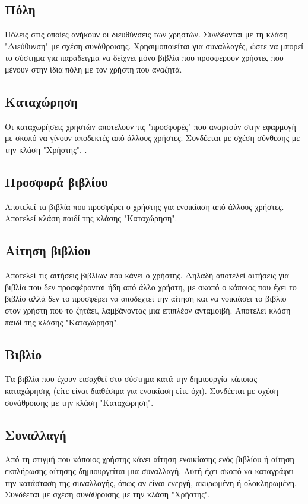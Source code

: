 \documentclass[12pt,a4paper]{article}
\begin{document}
\subsection{Πόλη}
Πόλεις στις οποίες ανήκουν οι διευθύνσεις των χρηστών. Συνδέονται με τη κλάση "Διεύθυνση" με σχέση συνάθροισης. Χρησιμοποιείται για συναλλαγές, ώστε να μπορεί το σύστημα για παράδειγμα να δείχνει μόνο βιβλία που προσφέρουν χρήστες που μένουν στην ίδια πόλη με τον χρήστη που αναζητά.

\subsection{Καταχώρηση}
Οι καταχωρήσεις χρηστών αποτελούν τις "προσφορές" που αναρτούν στην εφαρμογή με σκοπό να γίνουν αποδεκτές από άλλους χρήστες. Συνδέεται με σχέση σύνθεσης με την κλάση "Χρήστης".
.
\subsection{Προσφορά βιβλίου}
Αποτελεί τα βιβλία που προσφέρει ο χρήστης για ενοικίαση από άλλους χρήστες. Αποτελεί κλάση παιδί της κλάσης "Καταχώρηση".

\subsection{Αίτηση βιβλίου}
Αποτελεί τις αιτήσεις βιβλίων που κάνει ο χρήστης. Δηλαδή αποτελεί αιτήσεις για βιβλία που δεν προσφέρονται ήδη από άλλο χρήστη, με σκοπό ο κάποιος που έχει το βιβλίο αλλά δεν το προσφέρει να αποδεχτεί την αίτηση και να νοικιάσει το βιβλίο στον χρήστη που το ζητάει, λαμβάνοντας μια επιπλέον ανταμοιβή. Αποτελεί κλάση παιδί της κλάσης "Καταχώρηση".

\subsection{Βιβλίο}
Τα βιβλία που έχουν εισαχθεί στο σύστημα κατά την δημιουργία κάποιας καταχώρησης (είτε είναι διαθέσιμα για ενοικίαση είτε όχι). Συνδέεται με σχέση συνάθροισης με την κλάση "Καταχώρηση".

\subsection{Συναλλαγή}
Από τη στιγμή που κάποιος χρήστης κάνει αίτηση ενοικίασης ενός βιβλίου ή αίτηση εκπλήρωσης αίτησης δημιουργείται μια συναλλαγή. Αυτή έχει σκοπό να καταγράφει την κατάσταση της συναλλαγής, όπως αν είναι ενεργή, ακυρωμένη ή ολοκληρωμένη. Συνδέεται με σχέση συνάθροισης με την κλάση "Χρήστης".
\end{document}
